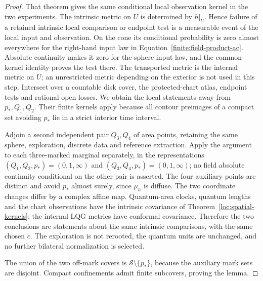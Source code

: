 \begin{proof}
That theorem gives the same conditional local observation kernel
in the two experiments.  The intrinsic metric on $U$ is determined
by $h|_U$.  Hence failure of a retained intrinsic local comparison or
endpoint test is a measurable event of the local input and observation.
On the cone its conditional probability is zero almost everywhere
for the right-hand input law in
Equation~\eqref{finite:field-product-ac}.  Absolute continuity makes
it zero for the sphere input law, and the common-kernel identity proves
the test there.  The transported metric is the internal metric on $U$;
an unrestricted metric depending on the exterior is not used in this
step.  Intersect over a countable disk cover, the protected-chart
atlas, endpoint tests and rational open losses.  We obtain the local
statements away from $p_*,Q_1,Q_2$.  Their finite kernels apply because
all contour preimages of a compact set avoiding $p_*$ lie in a strict
interior time interval.

Adjoin a second independent pair $Q_3,Q_4$ of area points, retaining
the same sphere, exploration, discrete data and reference extraction.
Apply the argument to each three-marked marginal separately, in the
representations $(Q_1,Q_2,p_*)=(0,1,\infty)$ and
$(Q_3,Q_4,p_*)=(0,1,\infty)$; no field absolute continuity conditional
on the other pair is asserted.  The four auxiliary points are distinct
and avoid $p_*$ almost surely, since $\mu_h$ is diffuse.  The two
coordinate changes differ by a complex affine map.  Quantum-area
clocks, quantum lengths and the chart observations have the intrinsic
covariance of Theorem~\ref{loc:spatial-kernels}; the internal LQG
metrics have conformal covariance.  Therefore the two conclusions
are statements about the same intrinsic comparisons, with the same
chosen $c$.  The exploration is not rerooted, the quantum units are
unchanged, and no further bilateral normalization is selected.

The union of the two off-mark covers is
$\mathcal S\setminus\{p_*\}$, because the auxiliary mark sets are
disjoint.  Compact confinements admit finite subcovers, proving the
lemma.
\end{proof}

